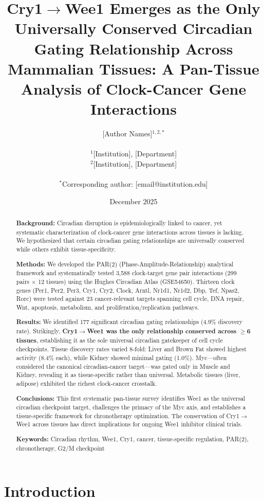 \documentclass[11pt,letterpaper]{article}
\title{\textbf{Cry1$\rightarrow$Wee1 Emerges as the Only Universally Conserved Circadian Gating Relationship Across Mammalian Tissues: A Pan-Tissue Analysis of Clock-Cancer Gene Interactions}}
\author{
[Author Names]$^{1,2,*}$ \\
\\
$^1$[Institution], [Department] \\
$^2$[Institution], [Department] \\
\\
$^*$Corresponding author: [email@institution.edu]
}
\date{December 2025}
\begin{document}
\maketitle

\begin{abstract}
\noindent\textbf{Background:} Circadian disruption is epidemiologically linked to cancer, yet systematic characterization of clock-cancer gene interactions across tissues is lacking. We hypothesized that certain circadian gating relationships are universally conserved while others exhibit tissue-specificity.

\noindent\textbf{Methods:} We developed the PAR(2) (Phase-Amplitude-Relationship) analytical framework and systematically tested 3,588 clock-target gene pair interactions (299 pairs $\times$ 12 tissues) using the Hughes Circadian Atlas (GSE54650). Thirteen clock genes (Per1, Per2, Per3, Cry1, Cry2, Clock, Arntl, Nr1d1, Nr1d2, Dbp, Tef, Npas2, Rorc) were tested against 23 cancer-relevant targets spanning cell cycle, DNA repair, Wnt, apoptosis, metabolism, and proliferation/replication pathways.

\noindent\textbf{Results:} We identified 177 significant circadian gating relationships (4.9\% discovery rate). Strikingly, \textbf{Cry1$\rightarrow$Wee1 was the only relationship conserved across $\geq$6 tissues}, establishing it as the sole universal circadian gatekeeper of cell cycle checkpoints. Tissue discovery rates varied 8-fold: Liver and Brown Fat showed highest activity (8.4\% each), while Kidney showed minimal gating (1.0\%). Myc---often considered the canonical circadian-cancer target---was gated only in Muscle and Kidney, revealing it as tissue-specific rather than universal. Metabolic tissues (liver, adipose) exhibited the richest clock-cancer crosstalk.

\noindent\textbf{Conclusions:} This first systematic pan-tissue survey identifies Wee1 as the universal circadian checkpoint target, challenges the primacy of the Myc axis, and establishes a tissue-specific framework for chronotherapy optimization. The conservation of Cry1$\rightarrow$Wee1 across tissues has direct implications for ongoing Wee1 inhibitor clinical trials.

\noindent\textbf{Keywords:} Circadian rhythm, Wee1, Cry1, cancer, tissue-specific regulation, PAR(2), chronotherapy, G2/M checkpoint
\end{abstract}

\newpage

\section{Introduction}
\end{document}
